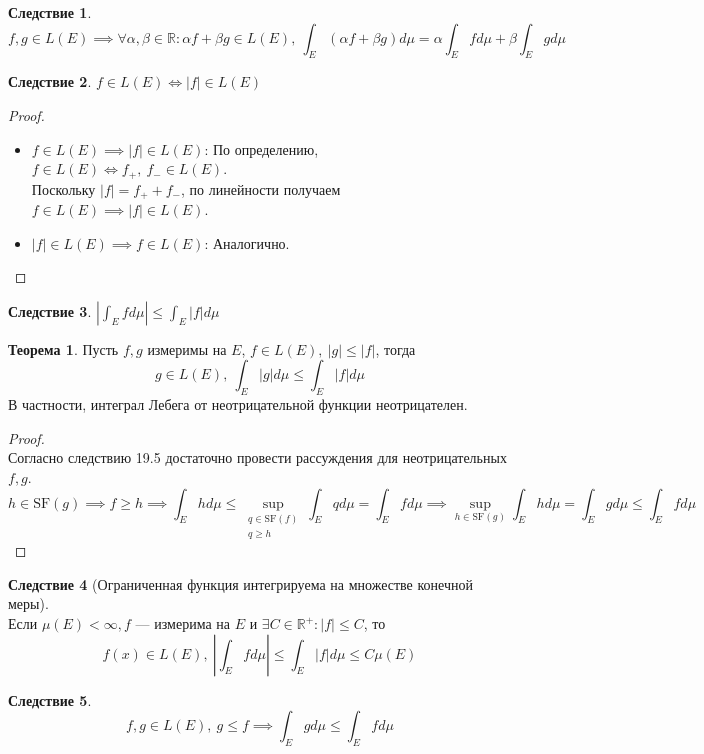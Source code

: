 \documentclass[11pt,a4paper]{report}
\def\Real{\mathbb{R}}
\theoremstyle{definition}
\theoremstyle{definition}
\newtheorem{theorem}{Теорема}[section]
\newtheorem{corollary}{Следствие}[section]
\theoremstyle{definition}
\begin{document}
		\begin{corollary}
			\[ f, g \in L(E) \implies \forall \alpha, \beta \in \Real: \alpha f + \beta g \in L(E),\ \int_{E} (\alpha f + \beta g) d\mu = \alpha \int_{E} f d\mu + \beta \int_{E} g d\mu \]
		\end{corollary}
		\begin{corollary}
			$ f \in L(E) \iff |f| \in L(E) $
		\end{corollary}
		\begin{proof}$  $
			\begin{itemize}
				\item $ f \in L(E) \implies |f| \in L(E) $:
				По определению, $ f \in L(E) \iff f_{+},\ f_{-} \in L(E) $.\\
				Поскольку $ |f| = f_{+} + f_{-} $, по линейности получаем $ f \in L(E) \implies |f| \in L(E) $.
				\item $ |f| \in L(E) \implies f \in L(E) $: 
				Аналогично.
			\end{itemize}
		\end{proof}
		\begin{corollary}
			$ \left | \int_{E} f d\mu \right | \le \int_{E} |f| d\mu $
		\end{corollary}
		\begin{theorem}
			Пусть $ f, g $ измеримы на $ E $, $ f \in L(E),\ |g| \le |f| $, тогда 
			\[ g \in L(E),\ \int_{E} |g| d\mu \le \int_{E} |f| d\mu \]
			В частности, интеграл Лебега от неотрицательной функции неотрицателен.
		\end{theorem}
		\begin{proof}$  $\\
			Согласно следствию 19.5 достаточно провести рассуждения для неотрицательных $ f, g $.\\
			\[ h \in \mbox{SF}(g) \implies f \ge h \implies \int_{E} h d\mu \le \sup\limits_{\substack{q \in \mbox{SF}(f)\\ q \ge h}}\int_{E} q d\mu = \int_{E} f d\mu \implies \sup\limits_{h \in \mbox{SF}(g)}\int_{E} h d\mu = \int_{E} g d\mu \le \int_{E} f d\mu \]
		\end{proof}
		\begin{corollary}[Ограниченная функция интегрируема на множестве конечной меры]$  $\\
			Если $ \mu(E) < \infty, f $ — измерима на $ E $ и $ \exists C \in \Real^{+}: |f| \le C $, то  
			\[ f(x) \in L(E),\ \left| \int_{E} f d\mu \right| \le \int_{E} |f| d\mu \le C \mu(E) \]
		\end{corollary}
		\begin{corollary}
			\[ f, g \in L(E),\ g \le f \implies \int_{E} g d\mu \le \int_{E} f d\mu \]
		\end{corollary}
\end{document}
